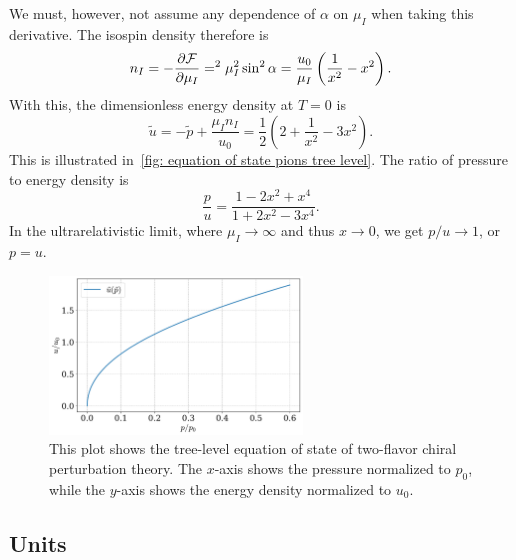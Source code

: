 We must, however, not assume any dependence of $\alpha$ on $\mu_I$ when taking this derivative.
The isospin density therefore is
%
\begin{equation}
    n_I = -\pdv{\mathcal{F}}{\mu_I} = ^2 \mu_I^2 \sin^2 \alpha 
    = 
    \frac{u_0}{\mu_I} \left(\frac{1}{x^2} - x^2\right).
\end{equation}
%
With this, the dimensionless energy density at $T = 0$ is
%
\begin{equation}
    \label{energy density leading order chpt}
    \tilde u = - \tilde p + \frac{\mu_I n_I}{u_0}
    = \frac{1}{2} \left( 2 + \frac{1}{x^2} - 3 x^2\right).
\end{equation}
%
This is illustrated in~\autoref{fig: equation of state pions tree level}.
The ratio of pressure to energy density is
%
\begin{equation} 
    \label{pressure energy ratio leading order chpt}
    \frac{p}{u} = \frac{1- 2x^2 + x^4  }{1 + 2x^2 -3x^4 }.
\end{equation}
%
In the ultrarelativistic limit, where $\mu_I \rightarrow \infty$ and thus $x \rightarrow 0$, we get $p / u \rightarrow 1$, or $p = u$.



\begin{figure}[h]
    \centering
    \includegraphics[width=0.6\textwidth]{../scripts/figurer/pion_star/pion_tree_eos.pdf}
    \caption{
        This plot shows the tree-level equation of state of two-flavor chiral perturbation theory. The $x$-axis shows the pressure normalized to $p_0$, while the $y$-axis shows the energy density normalized to $u_0$.
    }
    \label{fig: equation of state pions tree level}
\end{figure}


\subsection{Units}

